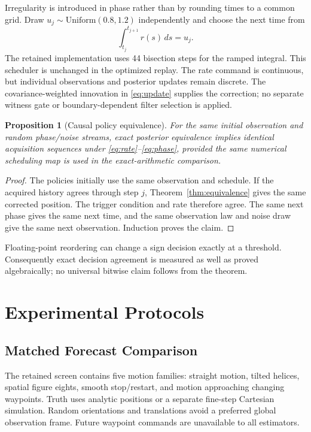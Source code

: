 \documentclass[journal]{IEEEtran}
\newtheorem{proposition}{Proposition}
\begin{document}
Irregularity is introduced in phase rather than by rounding times to a
common grid. Draw $u_j\sim\mathrm{Uniform}(0.8,1.2)$ independently and
choose the next time from
\begin{equation}
 \int_{t_j}^{t_{j+1}}r(s)\,ds=u_j.
 \label{eq:phase}
\end{equation}
The retained implementation uses 44 bisection steps for the ramped
integral. This scheduler is unchanged in the optimized replay. The rate
command is continuous, but individual observations and posterior updates
remain discrete. The covariance-weighted innovation in
\eqref{eq:update} supplies the correction; no separate witness gate or
boundary-dependent filter selection is applied.

\begin{proposition}[Causal policy equivalence]
For the same initial observation and random phase/noise streams, exact
posterior equivalence implies identical acquisition sequences under
\eqref{eq:rate}--\eqref{eq:phase}, provided the same numerical scheduling
map is used in the exact-arithmetic comparison.
\end{proposition}
\begin{proof}
The policies initially use the same observation and schedule. If the
acquired history agrees through step $j$, Theorem~\ref{thm:equivalence}
gives the same corrected position. The trigger condition and rate
therefore agree. The same next phase gives the same next time, and the
same observation law and noise draw give the same next observation.
Induction proves the claim.
\end{proof}

Floating-point reordering can change a sign decision exactly at a
threshold. Consequently exact decision agreement is measured as well as
proved algebraically; no universal bitwise claim follows from the theorem.

\section{Experimental Protocols}
\label{sec:protocols}

\subsection{Matched Forecast Comparison}
\label{sec:forecast-protocol}

The retained screen contains five motion families: straight motion,
tilted helices, spatial figure eights, smooth stop/restart, and motion
approaching changing waypoints. Truth uses analytic positions or a
separate fine-step Cartesian simulation. Random orientations and
translations avoid a preferred global observation frame. Future
waypoint commands are unavailable to all estimators.
\end{document}

